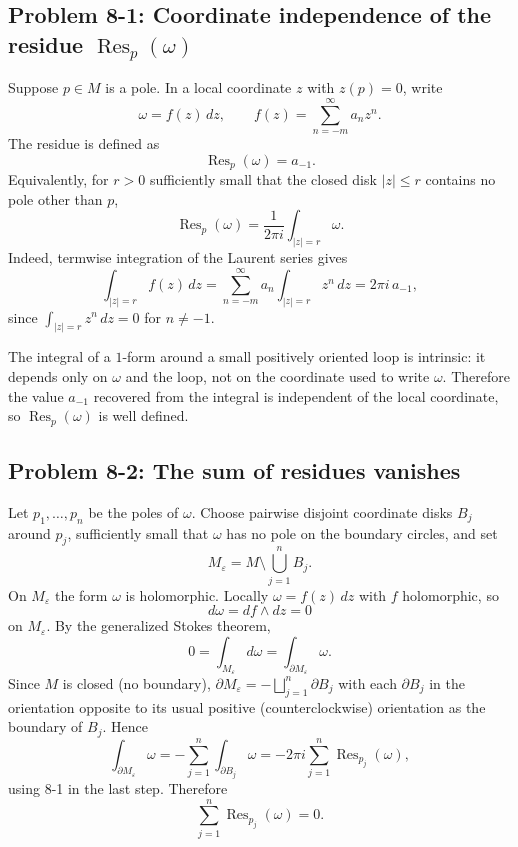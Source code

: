 \documentclass[11pt]{article}
\newcommand{\Res}{\operatorname{Res}}
\newcommand{\eps}{\varepsilon}
\begin{document}
\subsection*{Problem 8-1: Coordinate independence of the residue $\Res_p(\omega)$}

Suppose $p\in M$ is a pole. In a local coordinate $z$ with $z(p)=0$, write
\[
 \omega=f(z)\,dz,\qquad
 f(z)=\sum_{n=-m}^{\infty}a_nz^n.
\]
The residue is defined as
\[
 \Res_p(\omega)=a_{-1}.
\]
Equivalently, for $r>0$ sufficiently small that the closed disk $|z|\leq r$ contains no pole other than $p$,
\[
 \Res_p(\omega)=\frac{1}{2\pi i}\int_{|z|=r}\omega.
\]
Indeed, termwise integration of the Laurent series gives
\[
 \int_{|z|=r}f(z)\,dz
 =\sum_{n=-m}^\infty a_n\int_{|z|=r}z^n\,dz
 =2\pi i\,a_{-1},
\]
since $\int_{|z|=r}z^n\,dz=0$ for $n\neq-1$.

The integral of a $1$-form around a small positively oriented loop is intrinsic: it depends only on $\omega$ and the loop, not on the coordinate used to write $\omega$. Therefore the value $a_{-1}$ recovered from the integral is independent of the local coordinate, so $\Res_p(\omega)$ is well defined.

\subsection*{Problem 8-2: The sum of residues vanishes}

Let $p_1,\dots,p_n$ be the poles of $\omega$. Choose pairwise disjoint coordinate disks $B_j$ around $p_j$, sufficiently small that $\omega$ has no pole on the boundary circles, and set
\[
 M_\eps=M\setminus\bigcup_{j=1}^n B_j.
\]
On $M_\eps$ the form $\omega$ is holomorphic. Locally $\omega=f(z)\,dz$ with $f$ holomorphic, so
\[
 d\omega=df\wedge dz=0
\]
on $M_\eps$. By the generalized Stokes theorem,
\[
 0=\int_{M_\eps}d\omega=\int_{\partial M_\eps}\omega.
\]
Since $M$ is closed (no boundary), $\partial M_\eps=-\bigsqcup_{j=1}^n \partial B_j$ with each $\partial B_j$ in the orientation opposite to its usual positive (counterclockwise) orientation as the boundary of $B_j$. Hence
\[
 \int_{\partial M_\eps}\omega
 =
 -\sum_{j=1}^n\int_{\partial B_j}\omega
 =
 -2\pi i\sum_{j=1}^n\Res_{p_j}(\omega),
\]
using 8-1 in the last step. Therefore
\[
 \sum_{j=1}^n\Res_{p_j}(\omega)=0.
\]
\end{document}
